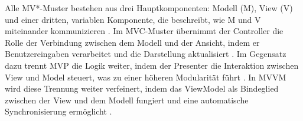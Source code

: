 Alle MV*-Muster bestehen aus drei Hauptkomponenten: Modell (M), View (V) und einer dritten, 
variablen Komponente, die beschreibt, wie M und V miteinander kommunizieren \cite{aihara2012mvc}. Im 
MVC-Muster übernimmt der Controller die Rolle der Verbindung zwischen dem Modell und der 
Ansicht, indem er Benutzereingaben verarbeitet und die Darstellung aktualisiert 
\cite{aihara2012mvc}. Im Gegensatz dazu trennt MVP die Logik weiter, indem der Presenter die 
Interaktion zwischen View und Model steuert, was zu einer höheren Modularität führt 
\cite{aihara2012mvc}. In MVVM wird diese Trennung weiter verfeinert, indem das ViewModel als 
Bindeglied zwischen der View und dem Modell fungiert und eine automatische Synchronisierung 
ermöglicht \cite{aihara2012mvc}.